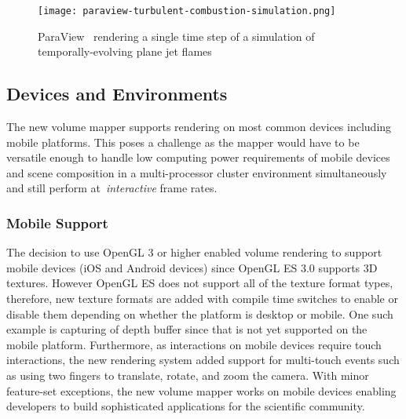 \begin{figure}[htb]
    \texttt{[image: paraview-turbulent-combustion-simulation.png]}
    \caption{ParaView~\protect\citep{ahrens_paraview:_2005, ayachit_paraview_2015,
      ayachit_paraview_2015-1} rendering a single time step of a simulation of
      temporally-evolving plane jet
      flames~\protect\citep{hiroshi_akiba_visualizing_2007}}
  \label{fig:application-areas}
\end{figure}

\subsection{Devices and Environments}
\label{devices-and-environments}
The new volume mapper supports rendering on most common devices including mobile
platforms.  This poses a challenge as the mapper would have to be versatile
enough to handle low computing power requirements of mobile devices and scene
composition in a multi-processor cluster environment simultaneously and still
perform at~\textit{interactive} frame rates. 

\subsubsection{Mobile Support}
\label{mobile}
The decision to use OpenGL 3 or higher enabled volume rendering to support
mobile devices (iOS and Android devices) since OpenGL ES 3.0 supports 3D textures.
However OpenGL ES does not support all of the texture format types, therefore,
new texture formats are added with compile time switches to enable or
disable them depending on whether the platform is desktop or mobile. One such
example is capturing of depth buffer since that is not yet supported on the
mobile platform.  Furthermore, as interactions on mobile devices require touch
interactions, the new rendering system added support for multi-touch events
such as using two fingers to translate, rotate, and zoom the camera. With minor
feature-set exceptions, the new volume mapper works on mobile devices enabling
developers to build sophisticated applications for the scientific community.

